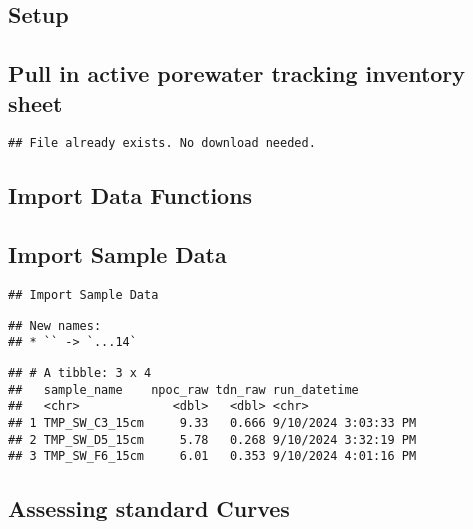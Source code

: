 \documentclass[
]{article}
\begin{document}
\hypertarget{setup}{%
\subsection{Setup}\label{setup}}

\hypertarget{pull-in-active-porewater-tracking-inventory-sheet}{%
\subsection{Pull in active porewater tracking inventory
sheet}\label{pull-in-active-porewater-tracking-inventory-sheet}}

\begin{verbatim}
## File already exists. No download needed.
\end{verbatim}

\newpage

\hypertarget{import-data-functions}{%
\subsection{Import Data Functions}\label{import-data-functions}}

\hypertarget{import-sample-data}{%
\subsection{Import Sample Data}\label{import-sample-data}}

\begin{verbatim}
## Import Sample Data
\end{verbatim}

\begin{verbatim}
## New names:
## * `` -> `...14`
\end{verbatim}

\begin{verbatim}
## # A tibble: 3 x 4
##   sample_name    npoc_raw tdn_raw run_datetime        
##   <chr>             <dbl>   <dbl> <chr>               
## 1 TMP_SW_C3_15cm     9.33   0.666 9/10/2024 3:03:33 PM
## 2 TMP_SW_D5_15cm     5.78   0.268 9/10/2024 3:32:19 PM
## 3 TMP_SW_F6_15cm     6.01   0.353 9/10/2024 4:01:16 PM
\end{verbatim}

\newpage

\hypertarget{assessing-standard-curves}{%
\subsection{Assessing standard Curves}\label{assessing-standard-curves}}
\end{document}
